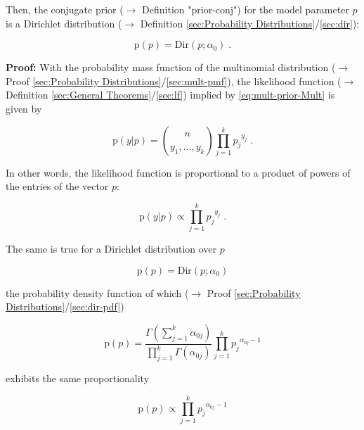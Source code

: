 \documentclass[a4paper,12pt,twoside]{book}
\begin{document}
Then, the conjugate prior ($\rightarrow$ Definition "prior-conj") for the model parameter $p$ is a Dirichlet distribution ($\rightarrow$ Definition \ref{sec:Probability Distributions}/\ref{sec:dir}):

\begin{equation} \label{eq:mult-prior-Dir}
\mathrm{p}(p) = \mathrm{Dir}(p; \alpha_0) \; .
\end{equation}


\vspace{1em}
\textbf{Proof:} With the probability mass function of the multinomial distribution ($\rightarrow$ Proof \ref{sec:Probability Distributions}/\ref{sec:mult-pmf}), the likelihood function ($\rightarrow$ Definition \ref{sec:General Theorems}/\ref{sec:lf}) implied by \eqref{eq:mult-prior-Mult} is given by

\begin{equation} \label{eq:mult-prior-Mult-LF}
\mathrm{p}(y|p) = {n \choose {y_1, \ldots, y_k}} \prod_{j=1}^{k} {p_j}^{y_j} \; .
\end{equation}

In other words, the likelihood function is proportional to a product of powers of the entries of the vector $p$:

\begin{equation} \label{eq:mult-prior-Mult-LF-prop}
\mathrm{p}(y|p) \propto \prod_{j=1}^{k} {p_j}^{y_j} \; .
\end{equation}

The same is true for a Dirichlet distribution over $p$

\begin{equation} \label{eq:mult-prior-Mult-prior-s1}
\mathrm{p}(p) = \mathrm{Dir}(p; \alpha_0)
\end{equation}

the probability density function of which ($\rightarrow$ Proof \ref{sec:Probability Distributions}/\ref{sec:dir-pdf})

\begin{equation} \label{eq:mult-prior-Mult-prior-s2}
\mathrm{p}(p) = \frac{\Gamma \left( \sum_{j=1}^{k} \alpha_{0j} \right)}{\prod_{j=1}^k \Gamma(\alpha_{0j})} \prod_{j=1}^{k} {p_j}^{\alpha_{0j}-1}
\end{equation}

exhibits the same proportionality

\begin{equation} \label{eq:mult-prior-Mult-prior-s3}
\mathrm{p}(p) \propto \prod_{j=1}^{k} {p_j}^{\alpha_{0j}-1}
\end{equation}
\end{document}
